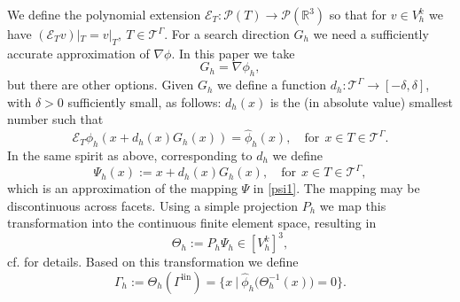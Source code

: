 \documentclass[final]{siamltex}
\begin{document}
We define the polynomial extension 
$\mathcal{E}_T: \mathcal{P}(T) \rightarrow \mathcal{P}(\mathbb{R}^3)$ so that for $v \in V_h^k$ we have $(\mathcal{E}_T v)|_T = v|_T,~T\in{{\mathcal T}^{\Gamma}}$.
For a search direction $G_h$ we need a sufficiently accurate approximation of $\nabla \phi$. In this paper we take 
\[ G_h = \nabla \phi_h,
\]
but there are other options.
Given $G_h$ we define a function $d_h: {{\mathcal{T}}^{\Gamma}} \to [-\delta,\delta]
$, with $\delta > 0$ sufficiently small, as follows: 
$d_h(x)$ is the (in absolute value) smallest number such that
\begin{equation} \label{eq:psihmap}
  \mathcal{E}_T \phi_h(x + d_h(x) G_h(x)) = {\hat \phi_h}(x), \quad \text{for}~~ x\in T \in {{\mathcal{T}}^{\Gamma}}.
\end{equation}
In the same spirit as above, corresponding to $d_h$ we define
\begin{equation} \label{eq:psih}
  \Psi_h(x) := x + d_h(x) G_h(x), \quad \text{for}~~ x\in T \in {{\mathcal{T}}^{\Gamma}},
\end{equation}
which is an approximation of the mapping $\Psi$ in \eqref{psi1}.
The mapping may be discontinuous across facets. Using a simple projection $P_h$ we map this transformation into the continuous finite element space, resulting in 
\begin{equation} \label{defThetah} \Theta_h := P_h \Psi_h \in [V_h^k]^3,
\end{equation}
 cf. \cite[Section 2.2]{CLARH1} for details. Based on this transformation we define
\begin{equation}
\Gamma_h := \Theta_h({\Gamma^{\text{lin}}}) = \{ x~|~\hat\phi_h \big( \Theta_h^{-1}(x)\big) = 0 \}.
\end{equation}
\end{document}
